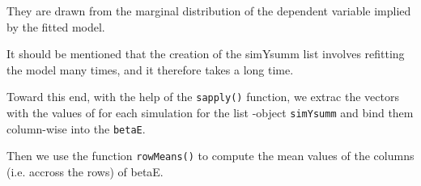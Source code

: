They are drawn from the marginal distribution of the dependent variable implied by the fitted model.



It should be mentioned that the creation of the simYsumm list involves refitting the model many times, and it therefore takes a long time.

Toward this end, with the help of the \texttt{sapply()} function, we extrac the vectors with the values of \hat{\beta} for each simulation for the list
-object \texttt{simYsumm} and bind them column-wise into the \texttt{betaE}.

Then we use the function \texttt{rowMeans()} to compute the mean values of the columns (i.e. accross the rows) of betaE.





